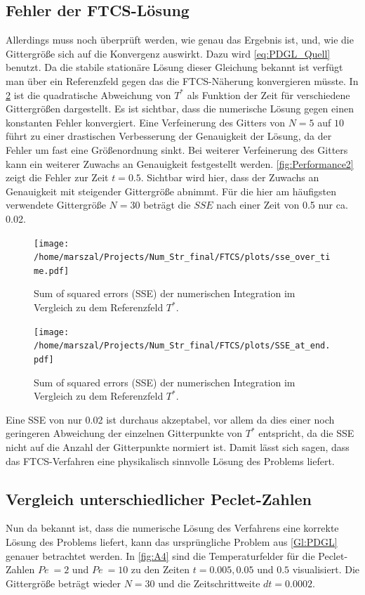 \subsection{Fehler der FTCS-Lösung}
Allerdings muss noch überprüft werden, wie genau das Ergebnis ist, und, wie die Gittergröße sich auf die Konvergenz auswirkt.
Dazu wird \cref{eq:PDGL_Quell} benutzt. Da die stabile stationäre Lösung dieser Gleichung bekannt ist verfügt man über ein Referenzfeld gegen das die FTCS-Näherung konvergieren müsste.
In \cref{fig:Performance1} ist die quadratische Abweichung von $T^*$ als Funktion der Zeit für verschiedene Gittergrößen dargestellt.
Es ist sichtbar, dass die numerische Lösung gegen einen konstanten Fehler konvergiert.
Eine Verfeinerung des Gitters von $N=5$ auf $10$ führt zu einer drastischen Verbesserung der Genauigkeit der Lösung, da der Fehler um fast eine Größenordnung sinkt. Bei weiterer Verfeinerung des Gitters kann ein weiterer Zuwachs an Genauigkeit festgestellt werden.
\cref{fig:Performance2} zeigt die Fehler zur Zeit $t=0.5$. Sichtbar wird hier, dass der Zuwachs an Genauigkeit mit steigender Gittergröße abnimmt.
Für die hier am häufigsten verwendete Gittergröße $N=30$ beträgt die $SSE$ nach einer Zeit von 0.5 nur ca. 0.02.
\begin{figure}
\centering
\texttt{[image: /home/marszal/Projects/Num\_Str\_final/FTCS/plots/sse\_over\_time.pdf]}\caption{Sum of squared errors (SSE) der numerischen Integration im Vergleich zu dem Referenzfeld $T^*$.}\label{fig:Performance1}
\end{figure}
\begin{figure}
\centering
\texttt{[image: /home/marszal/Projects/Num\_Str\_final/FTCS/plots/SSE\_at\_end.pdf]}\caption{Sum of squared errors (SSE) der numerischen Integration im Vergleich zu dem Referenzfeld $T^*$.}\label{fig:Performance1}
\end{figure}
Eine SSE von nur 0.02 ist durchaus akzeptabel, vor allem da dies einer noch geringeren Abweichung der einzelnen Gitterpunkte von $T^*$ entspricht, da die SSE nicht auf die Anzahl der Gitterpunkte normiert ist. Damit lässt sich sagen, dass das FTCS-Verfahren eine physikalisch sinnvolle Lösung des Problems liefert.
\subsection{Vergleich unterschiedlicher Peclet-Zahlen}
Nun da bekannt ist, dass die numerische Lösung des Verfahrens eine korrekte Lösung des Problems liefert, kann das ursprüngliche Problem aus \cref{Gl:PDGL} genauer betrachtet werden.
In \cref{fig:A4} sind die Temperaturfelder für die Peclet-Zahlen $Pe~=2$ und $Pe~=10$ zu den Zeiten $t = 0.005,0.05$ und $0.5$ visualisiert. Die Gittergröße beträgt wieder $N=30$ und die Zeitschrittweite $dt=0.0002$.

